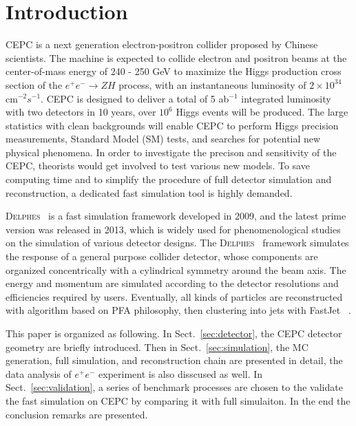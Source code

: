 \documentclass[a4paper,10pt,twoside]{cpc-hepnp}
\begin{document}


\section{Introduction}\label{sec:intro}

CEPC\cite{ref:cepc_det, ref:cepc_acc} is a next generation electron-positron collider proposed by Chinese scientists.
The machine is expected to collide electron and positron beams at the center-of-mass energy of 240 - 250 GeV
to maximize the Higgs production cross section of the $e^+e^- \to ZH$ process, with an instantaneous luminosity of $2\times10^{34}$ cm$^{-2} s^{-1}$.
CEPC is designed to deliver a total of 5 ab$^{-1}$ integrated luminosity with two detectors in 10 years,
over $10^6$ Higgs events will be produced. The large statistics with clean backgrounds will enable CEPC to perform Higgs precision measurements,
Standard Model (SM) tests, and searches for potential new physical phenomena.
In order to investigate the precison and sensitivity of the CEPC, theorists would get involved to test various new models.
To save computing time and to simplify the procedure of full detector simulation and reconstruction,
a dedicated fast simulation tool is highly demanded.

{\textsc{Delphes}~}\cite{ref:delphes} is a fast simulation framework developed in 2009, and the latest prime version was released in 2013,
which is widely used for phenomenological studies on the simulation of various detector designs.
The {\textsc{Delphes}~} framework simulates the response of a general purpose collider detector,
whose components are organized concentrically with a cylindrical symmetry around the beam axis.
The energy and momentum are simulated according to the detector resolutions and efficiencies required by users.
Eventually, all kinds of particles are reconstructed with algorithm based on PFA\cite{ref:pfa} philosophy,
then clustering into jets with FastJet~\cite{ref:fastjet} .

This paper is organized as following.  In Sect.{~\ref{sec:detector}}, the CEPC detector geometry are briefly introduced.
Then in Sect.{~\ref{sec:simulation}}, the MC generation, full simulation, and reconstruction chain are presented in detail,
the data analysis of $e^+e^-$  experiment is also disscused as well.
In Sect.{~\ref{sec:validation}}, a series of benchmark processes are chosen to the validate the fast simulation on CEPC
by comparing it with full simulaiton.
In the end the conclusion remarks are presented.
\end{document}
